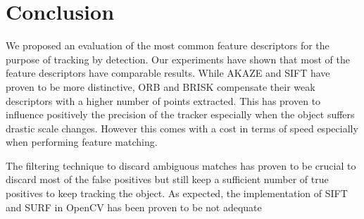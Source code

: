 \section{Conclusion}

We proposed an evaluation of the most common feature descriptors for the purpose of tracking by detection. Our experiments have shown that most of the feature descriptors have comparable results. While AKAZE and SIFT have proven to be more distinctive, ORB and BRISK compensate their weak descriptors with a higher number of points extracted. This has proven to influence positively the precision of the tracker especially when the object suffers drastic scale changes. However this comes with a cost in terms of speed especially when performing feature matching. 


The filtering technique to discard ambiguous matches has proven to be crucial to discard most of the false positives but still keep a sufficient number of true positives to keep tracking the object. As expected, the implementation of SIFT and SURF in OpenCV has been proven to be not adequate
